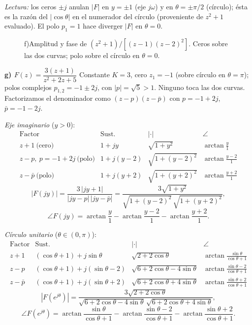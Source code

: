 \documentclass[10pt,a4paper]{article}
\begin{document}
\noindent\textit{Lectura:} los ceros $\pm j$ anulan $|F|$ en $y=\pm 1$ (eje $j\omega$) y en $\theta=\pm\pi/2$ (círculo); ésta es la razón del $|\cos\theta|$ en el numerador del círculo (proveniente de $z^2+1$ evaluado). El polo $p_1=1$ hace diverger $|F|$ en $\theta=0$.

\begin{figure}[H]\centering
	
	\caption{f)\enspace Amplitud y fase de $(z^2+1)/[(z-1)(z-2)^2]$. Ceros sobre las dos curvas; polo sobre el círculo en $\theta=0$.}
	\label{fig:resp16f}
\end{figure}

\bigskip

\noindent\textbf{g) $F(z)=\dfrac{3(z+1)}{z^2+2z+5}$}\;\textemdash\; Constante $K=3$, cero $z_1=-1$ (sobre círculo en $\theta=\pi$); polos complejos $p_{1,2}=-1\pm 2j$, con $|p|=\sqrt{5}>1$. Ninguno toca las dos curvas. Factorizamos el denominador como $(z-p)(z-\bar p)$ con $p=-1+2j$, $\bar p=-1-2j$.

\medskip
\noindent\textit{Eje imaginario} ($y>0$):
\[
	\renewcommand{\arraystretch}{1.3}
	\begin{array}{l|c|c|c}
	\text{Factor} & \text{Sust.} & |\cdot| & \angle \\\hline
	z+1\ \text{(cero)}         & 1+jy     & \sqrt{1+y^2}      & \arctan\tfrac{y}{1} \\
	z-p,\ p=-1+2j\ \text{(polo)} & 1+j(y-2) & \sqrt{1+(y-2)^2}  & \arctan\tfrac{y-2}{1} \\
	z-\bar p\ \text{(polo)}    & 1+j(y+2) & \sqrt{1+(y+2)^2}  & \arctan\tfrac{y+2}{1}
	\end{array}
\]
\[
	|F(jy)| = \frac{3\,|jy+1|}{|jy-p|\,|jy-\bar p|} = \frac{3\sqrt{1+y^2}}{\sqrt{1+(y-2)^2}\,\sqrt{1+(y+2)^2}},
\]
\[
	\angle F(jy) = \arctan\!\frac{y}{1} - \arctan\!\frac{y-2}{1} - \arctan\!\frac{y+2}{1}.
\]

\medskip
\noindent\textit{Círculo unitario} ($\theta\in(0,\pi)$):
\[
	\renewcommand{\arraystretch}{1.3}
	\begin{array}{l|c|c|c}
	\text{Factor} & \text{Sust.} & |\cdot| & \angle \\\hline
	z+1    & (\cos\theta+1)+j\sin\theta       & \sqrt{2+2\cos\theta}        & \arctan\tfrac{\sin\theta}{\cos\theta+1} \\
	z-p    & (\cos\theta+1)+j(\sin\theta-2)   & \sqrt{6+2\cos\theta-4\sin\theta} & \arctan\tfrac{\sin\theta-2}{\cos\theta+1} \\
	z-\bar p & (\cos\theta+1)+j(\sin\theta+2) & \sqrt{6+2\cos\theta+4\sin\theta} & \arctan\tfrac{\sin\theta+2}{\cos\theta+1}
	\end{array}
\]
\[
	|F(e^{j\theta})| = \frac{3\sqrt{2+2\cos\theta}}{\sqrt{6+2\cos\theta-4\sin\theta}\,\sqrt{6+2\cos\theta+4\sin\theta}},
\]
\[
	\angle F(e^{j\theta}) = \arctan\!\frac{\sin\theta}{\cos\theta+1} - \arctan\!\frac{\sin\theta-2}{\cos\theta+1} - \arctan\!\frac{\sin\theta+2}{\cos\theta+1}.
\]
\end{document}
